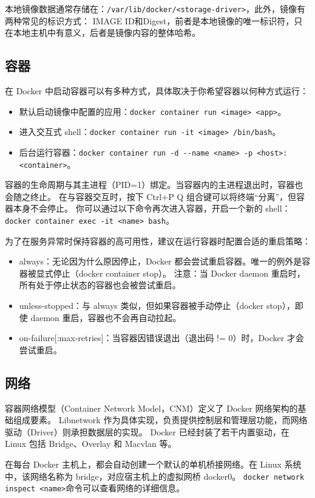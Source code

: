 本地镜像数据通常存储在：\verb|/var/lib/docker/<storage-driver>|，此外，镜像有两种常见的标识方式：
IMAGE ID和Digest，前者是本地镜像的唯一标识符，只在本地主机中有意义，后者是镜像内容的整体哈希。

\subsection{容器}
在 Docker 中启动容器可以有多种方式，具体取决于你希望容器以何种方式运行：
\begin{itemize}
	\item 默认启动镜像中配置的应用：\verb|docker container run <image> <app>|。
	\item 进入交互式 shell：\verb|docker container run -it <image> /bin/bash|。
	\item 后台运行容器：\verb|docker container run -d --name <name> -p <host>:<container>|。
\end{itemize}

容器的生命周期与其主进程（PID=1）绑定。当容器内的主进程退出时，容器也会随之终止。
在与容器交互时，按下 Ctrl+P Q 组合键可以将终端“分离”，但容器本身不会停止。
你可以通过以下命令再次进入容器，开启一个新的 shell：
\verb|docker container exec -it <name> bash|。

为了在服务异常时保持容器的高可用性，建议在运行容器时配置合适的重启策略：
\begin{itemize}
	\item always：无论因为什么原因停止，Docker 都会尝试重启容器。唯一的例外是容器被显式停止（docker container stop）。
	注意：当 Docker daemon 重启时，所有处于停止状态的容器也会被尝试重启。
	\item unless-stopped：与 always 类似，但如果容器被手动停止（docker stop），即使 daemon 重启，容器也不会再自动拉起。
	\item on-failure[:max-retries]：当容器因错误退出（退出码 != 0）时，Docker 才会尝试重启。
\end{itemize}

\subsection{网络}
容器网络模型（Container Network Model，CNM）定义了 Docker 网络架构的基础组成要素。
Libnetwork 作为具体实现，负责提供控制层和管理层功能，而网络驱动（Driver）则承担数据层的实现。
Docker 已经封装了若干内置驱动，在 Linux 包括 Bridge、Overlay 和 Macvlan 等。

在每台 Docker 主机上，都会自动创建一个默认的单机桥接网络。在 Linux 系统中，该网络名称为 bridge，对应宿主机上的虚拟网桥 docker0。
\verb|docker network inspect <name>|命令可以查看网络的详细信息。


